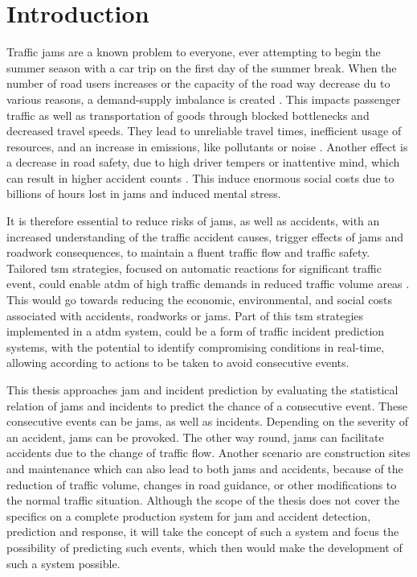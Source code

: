 \documentclass[a4paper,headsepline,footsepline,fontsize=11pt,BCOR=12mm,DIV=12]{report}
\begin{document}
\chapter{Introduction}
\setcounter{page}{1}
Traffic \glspl{jam} are a known problem to everyone, ever attempting to begin the summer season with a car trip on the first day of the summer break. When the number of road users increases or the capacity of the road way decrease du to various reasons, a demand-supply imbalance is created \cite{Tang2019}. This impacts passenger traffic as well as transportation of goods through blocked bottlenecks and decreased travel speeds. They lead to unreliable travel times, inefficient usage of resources, and an increase in emissions, like pollutants or noise \cite{FHA2011}. Another effect is a decrease in road safety, due to high driver tempers or inattentive mind, which can result in higher accident counts \cite{Sun2016}. This induce enormous social costs due to billions of hours lost in \glspl{jam} and induced mental stress. \cite{RetallackOstendorf2019,BardtFritsch2014,ADAC2019}

It is therefore essential to reduce risks of \glspl{jam}, as well as accidents, with an increased understanding of the traffic accident causes, trigger effects of \glspl{jam} and roadwork consequences, to maintain a fluent traffic flow and traffic safety. Tailored \acrfull{tsm} strategies, focused on automatic reactions for significant traffic event, could enable \acrfull{atdm} of high traffic demands in reduced traffic volume areas \cite{Tang2019}. This would go towards reducing the economic, environmental, and social costs associated with accidents, roadworks or \glspl{jam}. Part of this \acrshort{tsm} strategies implemented in a \acrshort{atdm} system, could be a form of traffic incident prediction systems, with the potential to identify compromising conditions in real-time, allowing according to actions to be taken to avoid consecutive events. \cite{RetallackOstendorf2019} 

\bigskip

This thesis approaches \gls{jam} and incident prediction by evaluating the statistical relation of \glspl{jam} and incidents to predict the chance of a consecutive event. These consecutive events can be \glspl{jam}, as well as incidents. Depending on the severity of an accident, \glspl{jam} can be provoked. The other way round, \glspl{jam} can facilitate accidents due to the change of traffic flow. Another scenario are construction sites and maintenance which can also lead to both \glspl{jam} and accidents, because of the reduction of traffic volume, changes in road guidance, or other modifications to the normal traffic situation. Although the scope of the thesis does not cover the specifics on a complete production system for \gls{jam} and accident detection, prediction and response, it will take the concept of such a system and focus the possibility of predicting such events, which then would make the development of such a system possible. 
\end{document}
